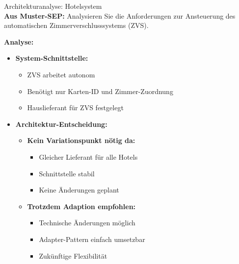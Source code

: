 \begin{example2}[breakable]{Architekturanalyse: Hotelsystem}\\
    \small
\textbf{Aus Muster-SEP:} Analysieren Sie die Anforderungen zur Ansteuerung des automatischen Zimmerverschlusssystems (ZVS).

\textbf{Analyse:}
\begin{itemize}
    \item \textbf{System-Schnittstelle:}
    \begin{itemize}
        \item ZVS arbeitet autonom
        \item Benötigt nur Karten-ID und Zimmer-Zuordnung
        \item Hauslieferant für ZVS festgelegt
    \end{itemize}
    
    \item \textbf{Architektur-Entscheidung:}
    \begin{itemize}
        \item \textbf{Kein Variationspunkt nötig da:}
        \begin{itemize}
            \item Gleicher Lieferant für alle Hotels
            \item Schnittstelle stabil
            \item Keine Änderungen geplant
        \end{itemize}
        
        \item \textbf{Trotzdem Adaption empfohlen:}
        \begin{itemize}
            \item Technische Änderungen möglich
            \item Adapter-Pattern einfach umsetzbar
            \item Zukünftige Flexibilität
        \end{itemize}
    \end{itemize}
\end{itemize}
\end{example2}


